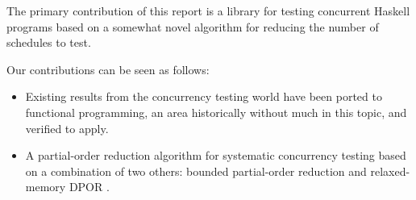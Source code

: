 The primary contribution of this report is a library for testing
concurrent Haskell programs based on a somewhat novel algorithm for
reducing the number of schedules to test.

Our contributions can be seen as follows:

\begin{itemize}
\item Existing results from the concurrency testing world have been
  ported to functional programming, an area historically without much
  in this topic, and verified to apply.

\item A partial-order reduction algorithm for systematic concurrency
  testing based on a combination of two others: bounded partial-order
  reduction \cite{bpor} and relaxed-memory DPOR \cite{rdpor}.
\end{itemize}
